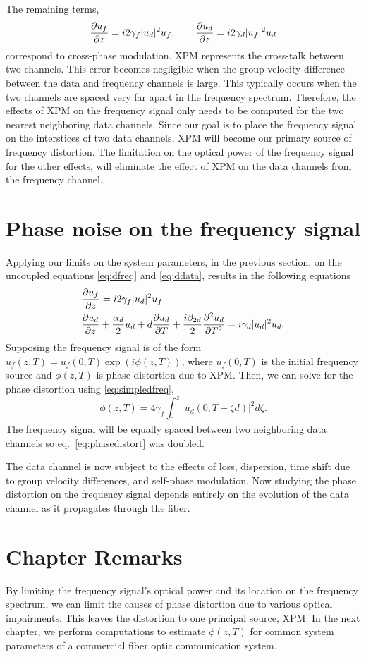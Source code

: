 The remaining terms,
\begin{equation*}
\frac{\partial u_f}{\partial z} = i2\gamma_f|u_d|^2u_f, \qquad \frac{\partial u_d}{\partial z} = i2\gamma_d|u_f|^2u_d
\end{equation*}
correspond to cross-phase modulation. XPM represents the cross-talk between two channels. This error becomes negligible when the group velocity difference between the data and frequency channels is large. This typically occurs when the two channels are spaced very far apart in the frequency spectrum. Therefore, the effects of XPM on the frequency signal only needs to be computed for the two nearest neighboring data channels. Since our goal is to place the frequency signal on the interstices of two data channels, XPM will become our primary source of frequency distortion. The limitation on the optical power of the frequency signal for the other effects, will eliminate the effect of XPM on the data channels from the frequency channel.

\section{Phase noise on the frequency signal} \label{sec:noisexpm}

Applying our limits on the system parameters, in the previous section, on the uncoupled equations \ref{eq:dfreq} and \ref{eq:ddata}, results in the following equations
%
\begin{align}
\label{eq:simpledfreq}
&\frac{\partial u_f}{\partial z} = i2\gamma_f|u_d|^2u_f \\
&\frac{\partial u_d}{\partial z} + \frac{\alpha_d}{2}u_d + d\frac{\partial u_d}{\partial T} + \frac{i\beta_{2d}}{2}\frac{\partial ^2u_d}{\partial T^2} = i\gamma_d|u_d|^2u_d.
\end{align}
%
Supposing the frequency signal is of the form $u_f(z,T) = u_f(0,T)\exp(i\phi(z,T))$, where $u_f(0,T)$ is the initial frequency source and $\phi(z,T)$ is phase distortion due to XPM. Then, we can solve for the phase distortion using \ref{eq:simpledfreq},
%
\begin{equation} \label{eq:phasedistort}
	\phi(z,T) = 4\gamma_f\int_0^z |u_d(0, T-\zeta d)|^2 d\zeta.
\end{equation}
%
The frequency signal will be equally spaced between two neighboring data channels so eq.~\ref{eq:phasedistort} was doubled.

The data channel is now subject to the effects of loss, dispersion, time shift due to group velocity differences, and self-phase modulation. Now studying the phase distortion on the frequency signal depends entirely on the evolution of the data channel as it propagates through the fiber.

\section{Chapter Remarks} \label{sec:3conc}

By limiting the frequency signal's optical power and its location on the frequency spectrum, we can limit the causes of phase distortion due to various optical impairments. This leaves the distortion to one principal source, XPM. In the next chapter, we perform computations to estimate $\phi(z,T)$ for common system parameters of a commercial fiber optic communication system.